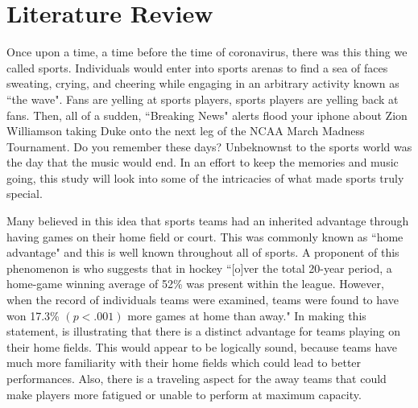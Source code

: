 \documentclass[12pt,english]{article}
\begin{document}
\section{Literature Review}\label{sec:litreview}
Once upon a time, a time before the time of coronavirus, there was this thing we called sports. Individuals would enter into sports arenas to find a sea of faces sweating, crying, and cheering while engaging in an arbitrary activity known as “the wave". Fans are yelling at sports players, sports players are yelling back at fans. Then, all of a sudden, “Breaking News" alerts flood your iphone about Zion Williamson taking Duke onto the next leg of the NCAA March Madness Tournament. Do you remember these days? Unbeknownst to the sports world was the day that the music would end. In an effort to keep the memories and music going, this study will look into some of the  intricacies of what made sports truly special. 
\par Many believed in this idea that sports teams had an inherited advantage through having games on their home field or court. This was commonly known as “home advantage" and this is well known throughout all of sports. A proponent of this phenomenon is \citet{Steven} who suggests that in hockey “[o]ver the total 20-year period, a home-game winning average of 52\% was present within the league. However, when the record of individuals teams were examined, teams were found to have won 17.3\% $(p <.001)$ more games at home than away." In making this statement, \citet{Steven} is illustrating that there is a distinct advantage for teams playing on their home fields. This would appear to be logically sound, because teams have much more familiarity with their home fields which could lead to better performances. Also, there is a traveling aspect for the away teams that could make players more fatigued or unable to perform at maximum capacity. 
\end{document}
